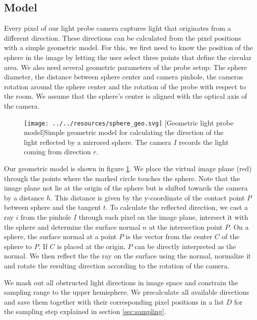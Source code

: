  
 \subsection{Model}
  \label{sec:probemodel}
 
 Every pixel of our light probe camera captures light that originates from a different direction.
 These directions can be calculated from the pixel positions with a simple geometric model.
 For this, we first need to know the position of the sphere in the image by letting the user select three points that define the circular area.
 We also need several geometric parameters of the probe setup: The sphere diameter, the distance between sphere center and camera pinhole,
  the cameras rotation around the sphere center and the rotation of the probe with respect to the room. 
 We assume that the sphere's center is aligned with the optical axis of the camera.
 
 \begin{figure}[h]
  \centering
  \texttt{[image: ../../resources/sphere\_geo.svg]} 
  [Geometric light probe model]{Simple geometric model for calculating the direction of the light reflected by a mirrored sphere. The camera $I$ records the light coming from direction $r$.}
  \label{fig:sphere_geo}
  \end{figure}
 
 Our geometric model is shown in figure \ref{fig:sphere_geo}.
 We place the virtual image plane (red) through the points where the marked circle touches the sphere. 
 Note that the image plane not lie at the origin of the sphere but is shifted towards the camera by a distance $h$. 
 This distance is given by the y-coordinate of the contact point $P$ between sphere and the tangent $t$.
 To calculate the reflected direction, we cast a ray $i$ from the pinhole $I$ through each pixel on the image plane, intersect it with the sphere and determine the surface normal $n$ at the intersection point $P$. 
 On a sphere, the surface normal at a point $P$ is the vector from the center $C$ of the sphere to $P$. If $C$ is placed at the origin, $P$ can be directly interpreted as the normal.
 We then reflect the the ray on the surface using the normal, normalize it and rotate the resulting direction according to the rotation of the camera.
 
 We mask out all obstructed light directions in image space and constrain the sampling range to the upper hemisphere.
 We precalculate all available directions and save them together with their corresponding pixel positions in a list $D$ for the sampling step explained in section \ref{sec:sampling}.
 
